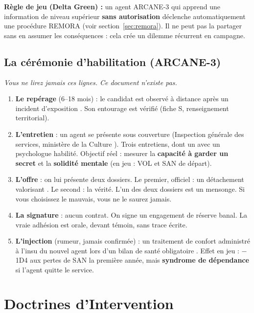 \documentclass[10pt,a5paper,twoside]{book}
\begin{document}
\begin{shaded}
\textbf{Règle de jeu (Delta Green) :} un agent ARCANE-3 qui apprend une information de niveau supérieur \textbf{sans autorisation} déclenche automatiquement une procédure \og REMORA \fg{} (voir section~\ref{sec:remora}). Il ne peut pas la partager sans en assumer les conséquences : cela crée un dilemme récurrent en campagne.
\end{shaded}

\subsection{La cérémonie d'habilitation (ARCANE-3)}

\begin{shaded}
\textit{Vous ne lirez jamais ces lignes. Ce document n'existe pas.}
\end{shaded}

\begin{enumerate}
\item \textbf{Le repérage} (6--18 mois) : le candidat est observé à distance après un \og incident d'exposition \fg. Son entourage est vérifié (fiche S, renseignement territorial).
\item \textbf{L'entretien} : un agent se présente sous couverture (\og Inspection générale des services, ministère de la Culture \fg). Trois entretiens, dont un avec un psychologue habilité. Objectif réel : mesurer la \textbf{capacité à garder un secret} et la \textbf{solidité mentale} (en jeu : VOL et SAN de départ).
\item \textbf{L'offre} : on lui présente deux dossiers. Le premier, officiel : un détachement \og valorisant \fg. Le second : la vérité. \og L'un des deux dossiers est un mensonge. Si vous choisissez le mauvais, vous ne le saurez jamais. \fg
\item \textbf{La signature} : aucun contrat. On signe un \og engagement de réserve \fg{} banal. La vraie adhésion est orale, devant témoin, sans trace écrite.
\item \textbf{L'injection} (rumeur, jamais confirmée) : un traitement \og de confort \fg{} administré à l'insu du nouvel agent lors d'un \og bilan de santé obligatoire \fg. Effet en jeu : $-$1D4 aux pertes de SAN la première année, mais \textbf{syndrome de dépendance} si l'agent quitte le service.
\end{enumerate}

\clearpage

\section{Doctrines d'Intervention}
\end{document}
